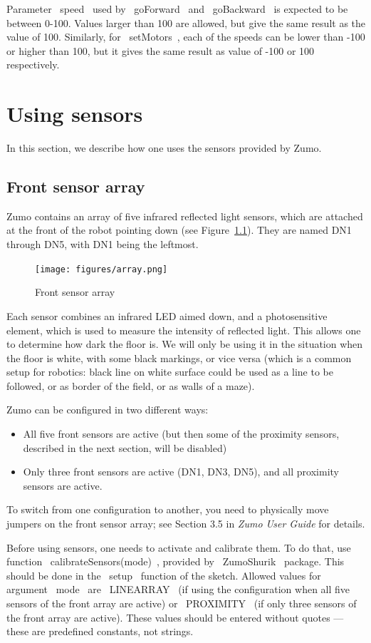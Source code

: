 \documentclass[oneside]{stml-l}
\numberwithin{figure}{chapter}
\newcommand{\firef}[1]{Figure\ {\rm\ref{#1}}}
\begin{document}
Parameter ~speed~ used by ~goForward~ and  ~goBackward~ is expected to be 
between 0-100. Values larger than 100 are allowed, but give the same result as the 
value of 100. Similarly, for ~setMotors~, each of the speeds can be lower than -100 
or higher than 100, but it gives the same result as value of -100 or 100 respectively. 

\chapter{Using sensors}

In this section, we describe how one uses the sensors provided by Zumo. 

\section{Front sensor array}
Zumo contains an array of five infrared reflected light sensors, 
which are attached at the front of the robot pointing down (see 
\firef{f:front_array}). They are named DN1 through DN5, with DN1 being the 
leftmost.

\begin{figure}[ht]
\texttt{[image: figures/array.png]}
\caption{Front sensor array}\label{f:front_array}
\end{figure}
Each sensor combines an infrared LED aimed down, and a 
photosensitive element, which is used to measure the intensity 
of reflected light. This allows one to determine how dark the 
floor is. We will only be using it in the situation when the 
floor is white, with some black markings, or vice versa (which is 
a common setup for robotics: black line on white surface could be 
used as a line to be followed, or as border of the field, or as 
walls of a maze). 

Zumo can be configured in two different ways: 
\begin{itemize}
\item All five front sensors are active (but then some of the 
proximity sensors, described in the next section, will be disabled)
\item Only three front sensors are active (DN1, DN3, DN5), and all 
proximity sensors are active.
\end{itemize}
To switch from one configuration to another, you need to physically 
move jumpers on the front sensor array; see Section 3.5 in 
{\it Zumo User Guide} for details. 

Before using sensors, one needs to activate and calibrate them.  
To do that, use function ~calibrateSensors(mode)~, provided by 
~ZumoShurik~ package. This should be done in the ~setup~ function 
of the sketch. Allowed values for argument ~mode~ are ~LINEARRAY~ 
(if using the configuration when all five sensors of the front 
array are active) or ~PROXIMITY~ (if only three sensors of the 
front array are active). These values should be entered without 
quotes --- these are predefined constants, not strings. 
\end{document}
